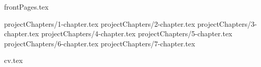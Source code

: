 \documentclass[a4paper,12pt,oneside,openany]{book}
\begin{document}
 {frontPages.tex}


 {projectChapters/1-chapter.tex}
 {projectChapters/2-chapter.tex}
 {projectChapters/3-chapter.tex}
 {projectChapters/4-chapter.tex}
 {projectChapters/5-chapter.tex}
 {projectChapters/6-chapter.tex}
 {projectChapters/7-chapter.tex}


\newpage\appendix



\newpage
{}
\singlespacing
\printbibliography[title={\bibName}]

\ifnum{}
\newpage
{}
 {cv.tex}
\fi
\end{document}

